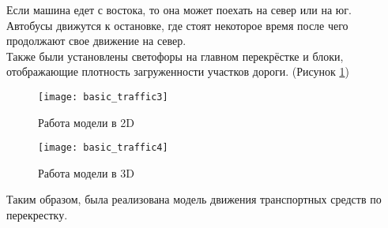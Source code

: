 Если машина едет с востока, то она может поехать на север или на юг.\\

Автобусы движутся к остановке, где стоят некоторое время после чего продолжают свое движение на север.\\

Также были установлены светофоры на главном перекрёстке и блоки, отображающие плотность загруженности участков дороги. (Рисунок \ref{fig:basic_traffic3})

\begin{figure}[h]
	\centering \texttt{[image: basic\_traffic3]}
	\caption{Работа модели в 2D}
	\label{fig:basic_traffic3}
\end{figure}

\begin{figure}[h]
	\centering \texttt{[image: basic\_traffic4]}
	\caption{Работа модели в 3D}
	\label{fig:basic_traffic4}
\end{figure}

Таким образом, была реализована модель движения транспортных средств по перекрестку.